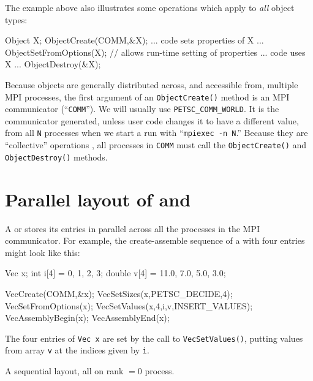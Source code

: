 The \pMat example above also illustrates some operations which apply to \emph{all} \PETSc object types:
\begin{code}
Object X;
ObjectCreate(COMM,&X);
... code sets properties of X ...
ObjectSetFromOptions(X);  // allows run-time setting of properties
... code uses X ...
ObjectDestroy(&X);
\end{code}
Because \PETSc objects are generally distributed across, and accessible from, multiple MPI processes, the first argument of an \texttt{ObjectCreate()} method is an MPI communicator (``\texttt{COMM}'').  We will usually use \texttt{PETSC\_COMM\_WORLD}.  It is the communicator generated, unless user code changes it to have a different value, from all \texttt{N} processes when we start a run with ``\verb|mpiexec -n N|.''  Because they are ``collective'' operations \citep{Groppetal1999}, all processes in \texttt{COMM} must call the \texttt{ObjectCreate()} and  \texttt{ObjectDestroy()} methods.


\section{Parallel layout of \pVecs and \pMats}

A \pVec or \pMat stores its entries in parallel across all the processes in the MPI communicator.  For example, the create-assemble sequence of a \pVec with four entries might look like this:
\begin{code}
Vec    x;
int    i[4] = {0, 1, 2, 3};
double v[4] = {11.0, 7.0, 5.0, 3.0};

VecCreate(COMM,&x);
VecSetSizes(x,PETSC_DECIDE,4);
VecSetFromOptions(x);
VecSetValues(x,4,i,v,INSERT_VALUES);
VecAssemblyBegin(x);
VecAssemblyEnd(x);
\end{code}
The four entries of \texttt{Vec x} are set by the call to \texttt{VecSetValues()}, putting values from array \texttt{v} at the indices given by \texttt{i}.

\begin{marginfigure}

\caption{A sequential \pVec layout, all on rank $=0$ process.}
\label{fig:seqveclayout}
\end{marginfigure}

